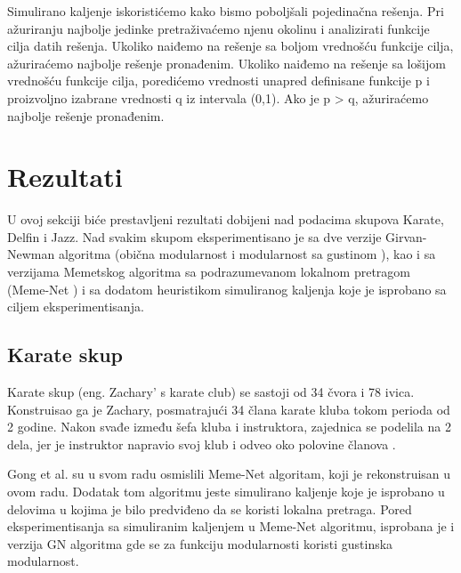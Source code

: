 \documentclass[a4paper]{article}
\begin{document}
Simulirano kaljenje iskoristićemo kako bismo poboljšali pojedinačna rešenja. Pri ažuriranju najbolje jedinke pretraživaćemo njenu okolinu i analizirati funkcije cilja datih rešenja. Ukoliko naiđemo na rešenje sa boljom vrednošću funkcije cilja, ažuriraćemo najbolje rešenje pronađenim. Ukoliko naiđemo na rešenje sa lošijom vrednošću funkcije cilja, poredićemo vrednosti unapred definisane funkcije  p  i proizvoljno izabrane vrednosti  q  iz intervala  (0,1). Ako je p > q, ažuriraćemo najbolje rešenje pronađenim.




\section{Rezultati}	
\label{sec:rezultati}
U ovoj sekciji biće prestavljeni rezultati dobijeni nad podacima skupova Karate, Delfin i Jazz. Nad svakim skupom eksperimentisano je sa dve verzije Girvan-Newman algoritma (obična modularnost \cite{fortunato2010community} i modularnost sa gustinom \cite{li2008quantitative}), kao i sa verzijama Memetskog algoritma sa podrazumevanom lokalnom pretragom (Meme-Net \cite{gong2011memetic}) i sa dodatom heuristikom simuliranog kaljenja koje je isprobano sa ciljem eksperimentisanja.

\subsection{Karate skup}
Karate skup (eng. Zachary’ s karate club) se sastoji od 34 čvora i 78 ivica. Konstruisao ga je Zachary, posmatrajući 34 člana karate kluba tokom perioda od 2 godine. Nakon svađe između šefa kluba i instruktora, zajednica se podelila na 2 dela, jer je instruktor napravio svoj klub i odveo oko polovine članova \cite{gong2011memetic}. 

Gong et al. su u svom radu osmislili Meme-Net algoritam, koji je rekonstruisan u ovom radu. Dodatak tom algoritmu jeste simulirano kaljenje koje je isprobano u delovima u kojima je bilo predviđeno da se koristi lokalna pretraga. Pored eksperimentisanja sa simuliranim kaljenjem u Meme-Net algoritmu, isprobana je i verzija GN algoritma gde se za funkciju modularnosti koristi gustinska modularnost.
\end{document}
